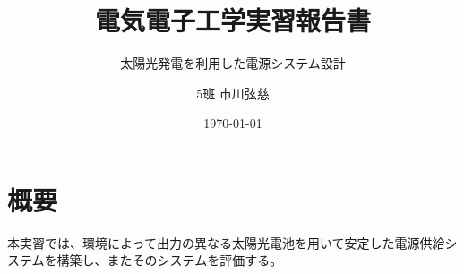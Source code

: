 \documentclass[a4paper,10pt,fleqn]{ltjsarticle} %
\title{電気電子工学実習報告書}
\subtitle{太陽光発電を利用した電源システム設計}
\author{5班 市川弦慈}
\date{\today}
\begin{document}
\maketitle
\thispagestyle{empty}

\newpage
\setcounter{page}{1}

\section{概要}

本実習では、環境によって出力の異なる太陽光電池を用いて安定した電源供給システムを構築し、またそのシステムを評価する。

% 
% 
% 
% 


\clearpage

% 
% 
\end{document}

